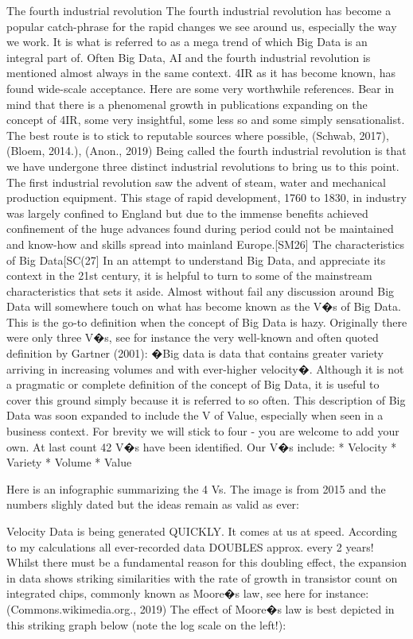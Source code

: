 \documentclass{book}
\begin{document}
The fourth industrial revolution
The fourth industrial revolution has become a popular catch-phrase for the rapid changes we see around us, especially the way we work.  It is what is referred to as a mega trend of which Big Data is an integral part of.  Often Big Data, AI and the fourth industrial revolution is mentioned almost always in the same context.  4IR as it has become known, has found wide-scale acceptance.   Here are some very worthwhile references.  Bear in mind that there is a phenomenal growth in publications expanding on the concept of 4IR, some very insightful, some less so and some simply sensationalist.  The best route is to stick to reputable sources where possible, (Schwab, 2017), (Bloem, 2014.), (Anon., 2019)
Being called the fourth industrial revolution is that we have undergone three distinct industrial revolutions to bring us to this point. 
The first industrial revolution saw the advent of steam, water and mechanical production equipment.  This stage of rapid development, 1760 to 1830, in industry was largely confined to England but due to the immense benefits achieved confinement of the huge advances found during period could not be maintained and know-how and skills spread into mainland Europe.[SM26]
The characteristics of Big Data[SC(27]
In an attempt to understand Big Data, and appreciate its context in the 21st century, it is helpful to turn to some of the mainstream characteristics that sets it aside.  Almost without fail any discussion around Big Data will somewhere touch on what has become known as the V�s of Big Data.  This is the go-to definition when the concept of Big Data is hazy.  Originally there were only three V�s, see for instance the very well-known and often quoted definition by Gartner (2001): �Big data is data that contains greater variety arriving in increasing volumes and with ever-higher velocity�. 
Although it is not a pragmatic or complete definition of the concept of Big Data, it is useful to cover this ground simply because it is referred to so often.
This description of Big Data was soon expanded to include the V of Value, especially when seen in a business context.  
For brevity we will stick to four - you are welcome to add your own.  At last count 42 V�s have been identified.  Our V�s include:
* Velocity
* Variety
* Volume
* Value

Here is an infographic summarizing the 4 Vs.  The image is from 2015 and the numbers slighly dated but the ideas remain as valid as ever:

 

Velocity
Data is being generated QUICKLY.  It comes at us at speed.  According to my calculations all ever-recorded data DOUBLES approx. every 2 years!  Whilst there must be a fundamental reason for this doubling effect, the expansion in data shows striking similarities with the rate of growth in transistor count on integrated chips, commonly known as Moore�s law, see here for instance:
(Commons.wikimedia.org., 2019)
The effect of Moore�s law is best depicted in this striking graph below (note the log scale on the left!): 
\end{document}
